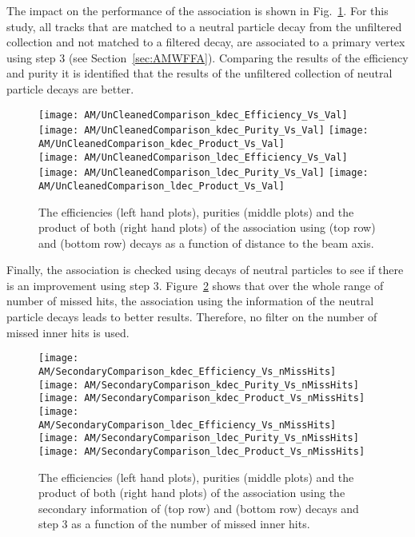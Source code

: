 The impact on the performance of the association is shown in Fig.~\ref{plot:AMWFSVdecEffAndPurRT}. For this study, all tracks that are matched to a neutral particle decay from the unfiltered collection and not matched to a filtered decay, are associated to a primary vertex using step 3 (see Section~\ref{sec:AMWFFA}). Comparing the results of the efficiency and purity it is identified that the results of the unfiltered collection of neutral particle decays are better.

\begin{figure}[!ht]
    \centering
    \texttt{[image: AM/UnCleanedComparison\_kdec\_Efficiency\_Vs\_Val]}
    \texttt{[image: AM/UnCleanedComparison\_kdec\_Purity\_Vs\_Val]}
    \texttt{[image: AM/UnCleanedComparison\_kdec\_Product\_Vs\_Val]}
    \\
    \texttt{[image: AM/UnCleanedComparison\_ldec\_Efficiency\_Vs\_Val]}
    \texttt{[image: AM/UnCleanedComparison\_ldec\_Purity\_Vs\_Val]}
    \texttt{[image: AM/UnCleanedComparison\_ldec\_Product\_Vs\_Val]}
    \caption[Efficiencies, purities and their product of the association using different \PKzS{} and \PgL{} decay collections as a function of distance to the beam axis]{The efficiencies (left hand plots), purities (middle plots) and the product of both (right hand plots) of the association using \PKzS{} (top row) and \PgL{} (bottom row) decays as a function of distance to the beam axis. \label{plot:AMWFSVdecEffAndPurRT}}
\end{figure}

Finally, the association is checked using decays of neutral particles to see if there is an improvement using step 3. Figure~\ref{plot:AMWFSVdecEffAndPurVsFA} shows that over the whole range of number of missed hits, the association using the information of the neutral particle decays leads to better results. Therefore, no filter on the number of missed inner hits is used.

\begin{figure}[!ht]
    \centering
    \texttt{[image: AM/SecondaryComparison\_kdec\_Efficiency\_Vs\_nMissHits]}
    \texttt{[image: AM/SecondaryComparison\_kdec\_Purity\_Vs\_nMissHits]}
    \texttt{[image: AM/SecondaryComparison\_kdec\_Product\_Vs\_nMissHits]}
    \\
    \texttt{[image: AM/SecondaryComparison\_ldec\_Efficiency\_Vs\_nMissHits]}
    \texttt{[image: AM/SecondaryComparison\_ldec\_Purity\_Vs\_nMissHits]}
    \texttt{[image: AM/SecondaryComparison\_ldec\_Product\_Vs\_nMissHits]}
    \caption[Efficiencies, purities and their product of the association using \PKzS{} and \PgL{} decays \vs{} step 3 as a function of missed inner hits]{The efficiencies (left hand plots), purities (middle plots) and the product of both (right hand plots) of the association using the secondary information of \PKzS{} (top row) and \PgL{} (bottom row) decays and step 3 as a function of the number of missed inner hits.\label{plot:AMWFSVdecEffAndPurVsFA}}
\end{figure}

